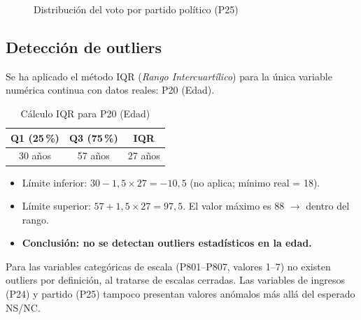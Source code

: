\documentclass[12pt,a4paper]{article}
\newcommand{\thead}[1]{\cellcolor{tableheader}\color{white}\textbf{#1}}
\begin{document}
\begin{figure}[H]
\centering
{}
\caption{Distribución del voto por partido político (P25)}
\end{figure}

\subsection{Detección de outliers}

Se ha aplicado el método IQR (\textit{Rango Intercuartílico}) para la única variable numérica continua con datos reales: P20 (Edad).

\begin{table}[H]
\centering
\renewcommand{\arraystretch}{1.3}
\begin{tabular}{ccc}
\toprule
\thead{Q1 (25\,\%)} & \thead{Q3 (75\,\%)} & \thead{IQR} \\
\midrule
30 años & 57 años & 27 años \\
\bottomrule
\end{tabular}
\caption{Cálculo IQR para P20 (Edad)}
\end{table}

\begin{itemize}[leftmargin=1.5em]
  \item Límite inferior: $30 - 1{,}5 \times 27 = -10{,}5$ (no aplica; mínimo real = 18).
  \item Límite superior: $57 + 1{,}5 \times 27 = 97{,}5$. El valor máximo es 88 $\rightarrow$ dentro del rango.
  \item \textbf{Conclusión: no se detectan outliers estadísticos en la edad.}
\end{itemize}

Para las variables categóricas de escala (P801--P807, valores 1--7) no existen outliers por definición, al tratarse de escalas cerradas. Las variables de ingresos (P24) y partido (P25) tampoco presentan valores anómalos más allá del esperado NS/NC.
\end{document}
